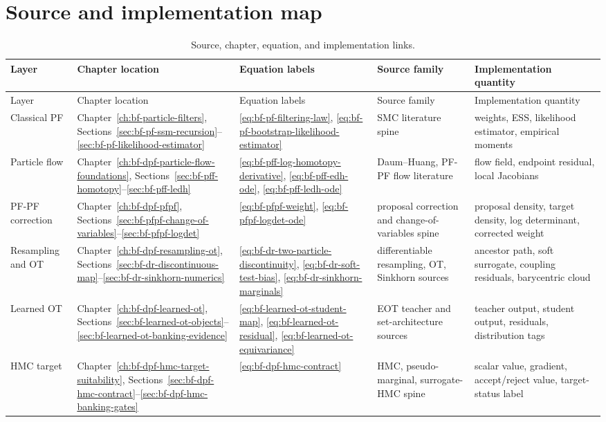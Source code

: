 \section{Source and implementation map}
\label{sec:bf-dpf-debug-source-implementation-map}

\begin{center}
\scriptsize
\begin{longtable}{@{}p{} p{} p{} p{} p{}@{}}
\caption{Source, chapter, equation, and implementation links.}
\label{tab:bf-dpf-debug-source-implementation-map}\\
\toprule
Layer & Chapter location & Equation labels & Source family & Implementation quantity \\
\midrule
\endfirsthead
\toprule
Layer & Chapter location & Equation labels & Source family & Implementation quantity \\
\midrule
\endhead
Classical PF &
Chapter~\ref{ch:bf-particle-filters}, Sections~\ref{sec:bf-pf-ssm-recursion}--\ref{sec:bf-pf-likelihood-estimator} &
\eqref{eq:bf-pf-filtering-law}, \eqref{eq:bf-pf-bootstrap-likelihood-estimator} &
SMC literature spine &
weights, ESS, likelihood estimator, empirical moments \\
Particle flow &
Chapter~\ref{ch:bf-dpf-particle-flow-foundations}, Sections~\ref{sec:bf-pff-homotopy}--\ref{sec:bf-pff-ledh} &
\eqref{eq:bf-pff-log-homotopy-derivative}, \eqref{eq:bf-pff-edh-ode}, \eqref{eq:bf-pff-ledh-ode} &
Daum--Huang, PF-PF flow literature &
flow field, endpoint residual, local Jacobians \\
PF-PF correction &
Chapter~\ref{ch:bf-dpf-pfpf}, Sections~\ref{sec:bf-pfpf-change-of-variables}--\ref{sec:bf-pfpf-logdet} &
\eqref{eq:bf-pfpf-weight}, \eqref{eq:bf-pfpf-logdet-ode} &
proposal correction and change-of-variables spine &
proposal density, target density, log determinant, corrected weight \\
Resampling and OT &
Chapter~\ref{ch:bf-dpf-resampling-ot}, Sections~\ref{sec:bf-dr-discontinuous-map}--\ref{sec:bf-dr-sinkhorn-numerics} &
\eqref{eq:bf-dr-two-particle-discontinuity}, \eqref{eq:bf-dr-soft-test-bias}, \eqref{eq:bf-dr-sinkhorn-marginals} &
differentiable resampling, OT, Sinkhorn sources &
ancestor path, soft surrogate, coupling residuals, barycentric cloud \\
Learned OT &
Chapter~\ref{ch:bf-dpf-learned-ot}, Sections~\ref{sec:bf-learned-ot-objects}--\ref{sec:bf-learned-ot-banking-evidence} &
\eqref{eq:bf-learned-ot-student-map}, \eqref{eq:bf-learned-ot-residual}, \eqref{eq:bf-learned-ot-equivariance} &
EOT teacher and set-architecture sources &
teacher output, student output, residuals, distribution tags \\
HMC target &
Chapter~\ref{ch:bf-dpf-hmc-target-suitability}, Sections~\ref{sec:bf-dpf-hmc-contract}--\ref{sec:bf-dpf-hmc-banking-gates} &
\eqref{eq:bf-dpf-hmc-contract} &
HMC, pseudo-marginal, surrogate-HMC spine &
scalar value, gradient, accept/reject value, target-status label \\
\bottomrule
\end{longtable}
\end{center}

